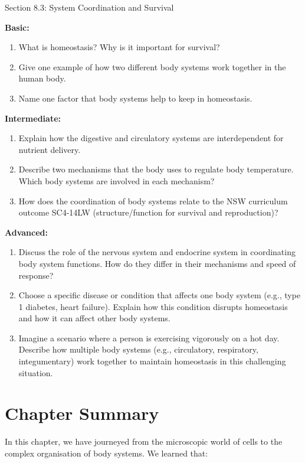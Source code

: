 \begin{tieredquestions}{Section 8.3: System Coordination and Survival}

\textbf{Basic:}
\begin{enumerate}
    \item What is homeostasis? Why is it important for survival?
    \item Give one example of how two different body systems work together in the human body.
    \item Name one factor that body systems help to keep in homeostasis.
\end{enumerate}

\textbf{Intermediate:}
\begin{enumerate}
    \item Explain how the digestive and circulatory systems are interdependent for nutrient delivery.
    \item Describe two mechanisms that the body uses to regulate body temperature. Which body systems are involved in each mechanism?
    \item How does the coordination of body systems relate to the NSW curriculum outcome SC4-14LW (structure/function for survival and reproduction)?
\end{enumerate}

\textbf{Advanced:}
\begin{enumerate}
    \item  Discuss the role of the nervous system and endocrine system in coordinating body system functions. How do they differ in their mechanisms and speed of response?
    \item  Choose a specific disease or condition that affects one body system (e.g., type 1 diabetes, heart failure). Explain how this condition disrupts homeostasis and how it can affect other body systems.
    \item  Imagine a scenario where a person is exercising vigorously on a hot day. Describe how multiple body systems (e.g., circulatory, respiratory, integumentary) work together to maintain homeostasis in this challenging situation.
\end{enumerate}
\end{tieredquestions}


\section*{Chapter Summary}

In this chapter, we have journeyed from the microscopic world of cells to the complex organisation of body systems. We learned that:

